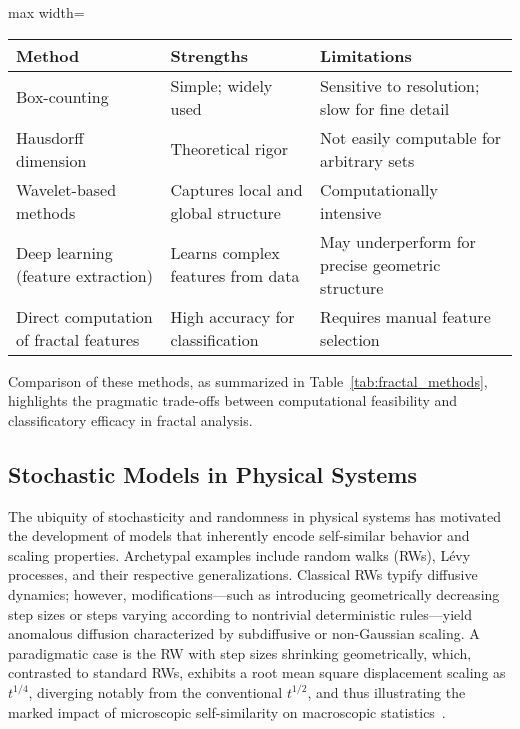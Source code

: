 \begin{table*}[htbp]
\centering
\caption{Selected Approaches to Fractal Dimension Estimation and Their Applicability}
\label{tab:fractal_methods}
\begin{adjustbox}{max width=\textwidth}
\begin{tabular}{lll}
\toprule
\textbf{Method}                 & \textbf{Strengths}                          & \textbf{Limitations}                    \\
\midrule
Box-counting                    & Simple; widely used                         & Sensitive to resolution; slow for fine detail \\
Hausdorff dimension             & Theoretical rigor                           & Not easily computable for arbitrary sets      \\
Wavelet-based methods           & Captures local and global structure         & Computationally intensive                      \\
Deep learning (feature extraction) & Learns complex features from data         & May underperform for precise geometric structure \\
Direct computation of fractal features & High accuracy for classification     & Requires manual feature selection                \\
\bottomrule
\end{tabular}
\end{adjustbox}
\end{table*}

Comparison of these methods, as summarized in Table~\ref{tab:fractal_methods}, highlights the pragmatic trade-offs between computational feasibility and classificatory efficacy in fractal analysis.

\subsection{Stochastic Models in Physical Systems}

The ubiquity of stochasticity and randomness in physical systems has motivated the development of models that inherently encode self-similar behavior and scaling properties. Archetypal examples include random walks (RWs), Lévy processes, and their respective generalizations. Classical RWs typify diffusive dynamics; however, modifications—such as introducing geometrically decreasing step sizes or steps varying according to nontrivial deterministic rules—yield anomalous diffusion characterized by subdiffusive or non-Gaussian scaling. A paradigmatic case is the RW with step sizes shrinking geometrically, which, contrasted to standard RWs, exhibits a root mean square displacement scaling as $t^{1/4}$, diverging notably from the conventional $t^{1/2}$, and thus illustrating the marked impact of microscopic self-similarity on macroscopic statistics~\cite{ref57}.

